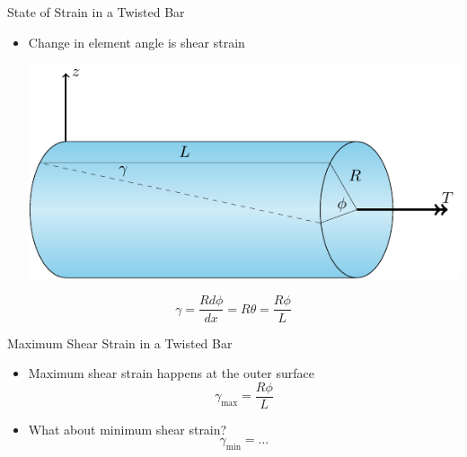 \documentclass[10pt, svgnames]{beamer}
\begin{document}
\begin{frame}[label={sec:org6e27750}]{State of Strain in a Twisted Bar}
\begin{itemize}
\item Change in element angle is shear strain

\begin{center}
\includegraphics[width=.9\linewidth]{pictures/state-of-strain.pdf}
\end{center}
\end{itemize}

\[\gamma = \frac{Rd\phi}{dx} = R\theta = \frac{R\phi}{L}\]
\end{frame}

\begin{frame}[label={sec:orgbfee682}]{Maximum Shear Strain in a Twisted Bar}
\begin{itemize}
\item Maximum shear strain happens at the outer surface
\[\gamma_{\max} = \frac{R \phi}{L}\]

\item What about minimum shear strain? \[\gamma_{\min} = \ldots\]
\end{itemize}
\end{frame}
\end{document}
